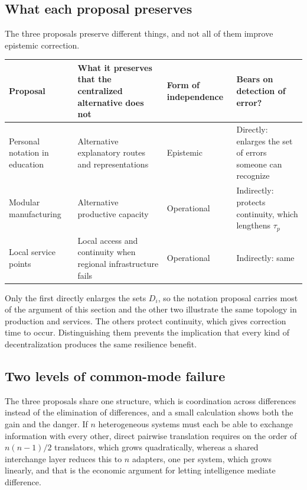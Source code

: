 \documentclass[11pt]{article}
\begin{document}
\subsection{What each proposal preserves}

The three proposals preserve different things, and not all of them improve epistemic correction.

\begin{center}
\small
\begin{tabular}{@{}p{}p{}p{}p{}@{}}
\toprule
\textbf{Proposal} & \textbf{What it preserves that the centralized alternative does not} & \textbf{Form of independence} & \textbf{Bears on detection of error?}\\
\midrule
Personal notation in education & Alternative explanatory routes and representations & Epistemic & Directly: enlarges the set of errors someone can recognize\\[0.5em]
Modular manufacturing & Alternative productive capacity & Operational & Indirectly: protects continuity, which lengthens $\tau_p$\\[0.5em]
Local service points & Local access and continuity when regional infrastructure fails & Operational & Indirectly: same\\
\bottomrule
\end{tabular}
\end{center}

Only the first directly enlarges the sets $D_i$, so the notation proposal carries most of the argument of this section and the other two illustrate the same topology in production and services. The others protect continuity, which gives correction time to occur. Distinguishing them prevents the implication that every kind of decentralization produces the same resilience benefit.

\subsection{Two levels of common-mode failure}

The three proposals share one structure, which is coordination across differences instead of the elimination of differences, and a small calculation shows both the gain and the danger. If $n$ heterogeneous systems must each be able to exchange information with every other, direct pairwise translation requires on the order of $n(n-1)/2$ translators, which grows quadratically, whereas a shared interchange layer reduces this to $n$ adapters, one per system, which grows linearly, and that is the economic argument for letting intelligence mediate difference.
\end{document}

